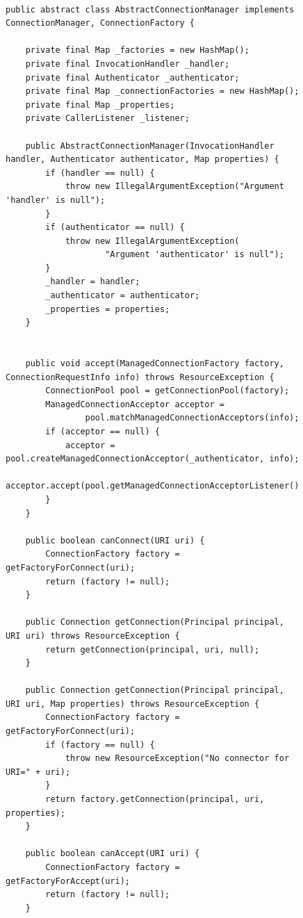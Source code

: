 \begin{figure}[!tbp]
\centering
\lstset{language=Java,basicstyle=\scriptsize, stepnumber=1, showspaces=false, showstringspaces=false,breaklines=true}
\begin{lstlisting}

public abstract class AbstractConnectionManager implements ConnectionManager, ConnectionFactory {

    private final Map _factories = new HashMap();
    private final InvocationHandler _handler;
    private final Authenticator _authenticator;
    private final Map _connectionFactories = new HashMap();
    private final Map _properties;
    private CallerListener _listener;

    public AbstractConnectionManager(InvocationHandler handler, Authenticator authenticator, Map properties) {
        if (handler == null) {
            throw new IllegalArgumentException("Argument 'handler' is null");
        }
        if (authenticator == null) {
            throw new IllegalArgumentException(
                    "Argument 'authenticator' is null");
        }
        _handler = handler;
        _authenticator = authenticator;
        _properties = properties;
    }


    public void accept(ManagedConnectionFactory factory, ConnectionRequestInfo info) throws ResourceException {
        ConnectionPool pool = getConnectionPool(factory);
        ManagedConnectionAcceptor acceptor =
                pool.matchManagedConnectionAcceptors(info);
        if (acceptor == null) {
            acceptor = pool.createManagedConnectionAcceptor(_authenticator, info);
            acceptor.accept(pool.getManagedConnectionAcceptorListener());
        }
    }

    public boolean canConnect(URI uri) {
        ConnectionFactory factory = getFactoryForConnect(uri);
        return (factory != null);
    }

    public Connection getConnection(Principal principal, URI uri) throws ResourceException {
        return getConnection(principal, uri, null);
    }

    public Connection getConnection(Principal principal, URI uri, Map properties) throws ResourceException {
        ConnectionFactory factory = getFactoryForConnect(uri);
        if (factory == null) {
            throw new ResourceException("No connector for URI=" + uri);
        }
        return factory.getConnection(principal, uri, properties);
    }

    public boolean canAccept(URI uri) {
        ConnectionFactory factory = getFactoryForAccept(uri);
        return (factory != null);
    }


\end{lstlisting}
\end{figure}
